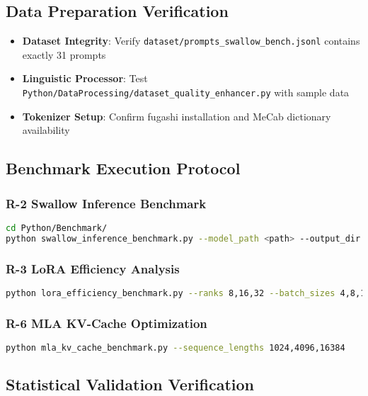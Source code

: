 \documentclass[12pt,a4paper]{article}
\begin{document}
\subsection{Data Preparation Verification}

\begin{itemize}[label=$\square$]
\item \textbf{Dataset Integrity}: Verify \texttt{dataset/prompts\_swallow\_bench.jsonl} contains exactly 31 prompts
\item \textbf{Linguistic Processor}: Test \texttt{Python/DataProcessing/dataset\_quality\_enhancer.py} with sample data
\item \textbf{Tokenizer Setup}: Confirm fugashi installation and MeCab dictionary availability
\end{itemize}

\subsection{Benchmark Execution Protocol}

\subsubsection{R-2 Swallow Inference Benchmark}
\begin{lstlisting}[language=bash]
cd Python/Benchmark/
python swallow_inference_benchmark.py --model_path <path> --output_dir results/
\end{lstlisting}

\subsubsection{R-3 LoRA Efficiency Analysis}
\begin{lstlisting}[language=bash]
python lora_efficiency_benchmark.py --ranks 8,16,32 --batch_sizes 4,8,16
\end{lstlisting}

\subsubsection{R-6 MLA KV-Cache Optimization}
\begin{lstlisting}[language=bash]
python mla_kv_cache_benchmark.py --sequence_lengths 1024,4096,16384
\end{lstlisting}

\subsection{Statistical Validation Verification}
\end{document}
